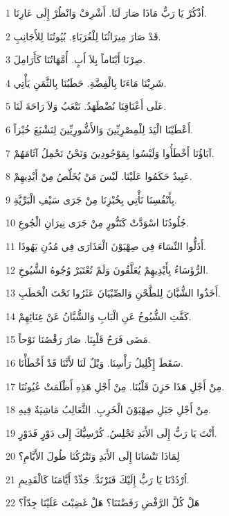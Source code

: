 \par 1 اُذْكُرْ يَا رَبُّ مَاذَا صَارَ لَنَا. أَشْرِفْ وَانْظُرْ إِلَى عَارِنَا.
\par 2 قَدْ صَارَ مِيرَاثُنَا لِلْغُرَبَاءِ. بُيُوتُنَا لِلأَجَانِبِ.
\par 3 صِرْنَا أَيْتَاماً بِلاَ أَبٍ. أُمَّهَاتُنَا كَأَرَامِلَ.
\par 4 شَرِبْنَا مَاءَنَا بِالْفِضَّةِ. حَطَبُنَا بِالثَّمَنِ يَأْتِي.
\par 5 عَلَى أَعْنَاقِنَا نُضْطَهَدُ. نَتْعَبُ وَلاَ رَاحَةَ لَنَا.
\par 6 أَعْطَيْنَا الْيَدَ لِلْمِصْرِيِّينَ وَالأَشُّورِيِّينَ لِنَشْبَعَ خُبْزاً.
\par 7 آبَاؤُنَا أَخْطَأُوا وَلَيْسُوا بِمَوْجُودِينَ وَنَحْنُ نَحْمِلُ آثَامَهُمْ.
\par 8 عَبِيدٌ حَكَمُوا عَلَيْنَا. لَيْسَ مَنْ يُخَلِّصُ مِنْ أَيْدِيهِمْ.
\par 9 بِأَنْفُسِنَا نَأْتِي بِخُبْزِنَا مِنْ جَرَى سَيْفِ الْبَرِّيَّةِ.
\par 10 جُلُودُنَا اسْوَدَّتْ كَتَنُّورٍ مِنْ جَرَى نِيرَانِ الْجُوعِ.
\par 11 أَذَلُّوا النِّسَاءَ فِي صِهْيَوْنَ الْعَذَارَى فِي مُدُنِ يَهُوذَا.
\par 12 الرُّؤَسَاءُ بِأَيْدِيهِمْ يُعَلَّقُونَ وَلَمْ تُعْتَبَرْ وُجُوهُ الشُّيُوخِ.
\par 13 أَخَذُوا الشُّبَّانَ لِلطَّحْنِ وَالصِّبْيَانَ عَثَرُوا تَحْتَ الْحَطَبِ.
\par 14 كَفَّتِ الشُّيُوخُ عَنِ الْبَابِ وَالشُّبَّانُ عَنْ غِنَائِهِمْ.
\par 15 مَضَى فَرَحُ قَلْبِنَا. صَارَ رَقْصُنَا نَوْحاً.
\par 16 سَقَطَ إِكْلِيلُ رَأْسِنَا. وَيْلٌ لَنَا لأَنَّنَا قَدْ أَخْطَأْنَا.
\par 17 مِنْ أَجْلِ هَذَا حَزِنَ قَلْبُنَا. مِنْ أَجْلِ هَذِهِ أَظْلَمَتْ عُيُونُنَا.
\par 18 مِنْ أَجْلِ جَبَلِ صِهْيَوْنَ الْخَرِبِ. الثَّعَالِبُ مَاشِيَةٌ فِيهِ.
\par 19 أَنْتَ يَا رَبُّ إِلَى الأَبَدِ تَجْلِسُ. كُرْسِيُّكَ إِلَى دَوْرٍ فَدَوْرٍ.
\par 20 لِمَاذَا تَنْسَانَا إِلَى الأَبَدِ وَتَتْرُكُنَا طُولَ الأَيَّامِ؟
\par 21 اُرْدُدْنَا يَا رَبُّ إِلَيْكَ فَنَرْتَدَّ. جَدِّدْ أَيَّامَنَا كَالْقَدِيمِ.
\par 22 هَلْ كُلَّ الرَّفْضِ رَفَضْتَنَا؟ هَلْ غَضِبْتَ عَلَيْنَا جِدّاً؟

